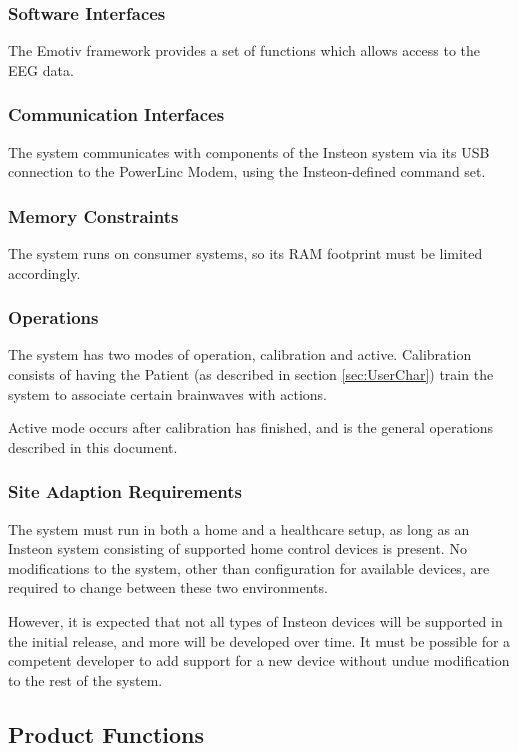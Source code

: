 \documentclass{article}
\begin{document}
\subsubsection{Software Interfaces}

The Emotiv framework provides a set of functions which allows access to the
EEG data.

\subsubsection{Communication Interfaces}

The system communicates with components of the Insteon system via its USB
connection to the PowerLinc Modem, using the Insteon-defined command set.

\subsubsection{Memory Constraints}

The system runs on consumer systems, so its RAM footprint must be limited
accordingly.

\subsubsection{Operations}
The system has two modes of operation, calibration and active. Calibration
consists of having the Patient (as described in section \ref{sec:UserChar})
train the system to associate certain brainwaves with actions.

Active mode occurs after calibration has finished, and is the general
operations described in this document.

\subsubsection{Site Adaption Requirements}
The system must run in both a home and a healthcare setup, as long as an
Insteon system consisting of supported home control devices is present. No
modifications to the system, other than configuration for available devices,
are required to change between these two environments.

However, it is expected that not all types of Insteon devices will be
supported in the initial release, and more will be developed over time. It
must be possible for a competent developer to add support for a new device
without undue modification to the rest of the system.

\subsection{Product Functions}
\end{document}

